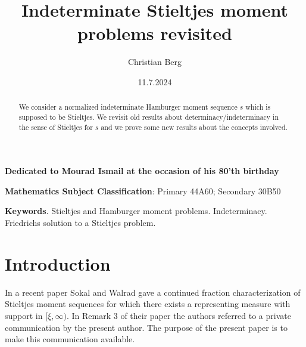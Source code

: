 \documentclass[12pt]{article}
\author {Christian Berg}
\title {Indeterminate Stieltjes moment problems revisited}
\date{11.7.2024}
\begin{document}
\maketitle

\begin{center}
{\bf Dedicated to Mourad Ismail at the occasion of his 80'th birthday}  
\end{center}

\medskip
\begin{abstract} We consider a normalized indeterminate Hamburger moment sequence $s$ which is supposed to be Stieltjes. We revisit old results about determinacy/indeterminacy in the sense of Stieltjes for $s$ and we prove some new results about the concepts involved.
\end{abstract}

{\bf Mathematics Subject Classification}: Primary 44A60; Secondary 30B50

{\bf Keywords}. Stieltjes and Hamburger moment problems. Indeterminacy. Friedrichs solution to a Stieltjes problem.

\section{Introduction}

In a recent paper  Sokal and Walrad \cite{S:W} gave a continued fraction characterization of Stieltjes moment sequences for which there exists a representing measure with support in $[\xi,\infty)$. In Remark 3 of their paper the authors referred to a private communication by the present author. The purpose of the present paper is to make this communication available.  
\end{document}
